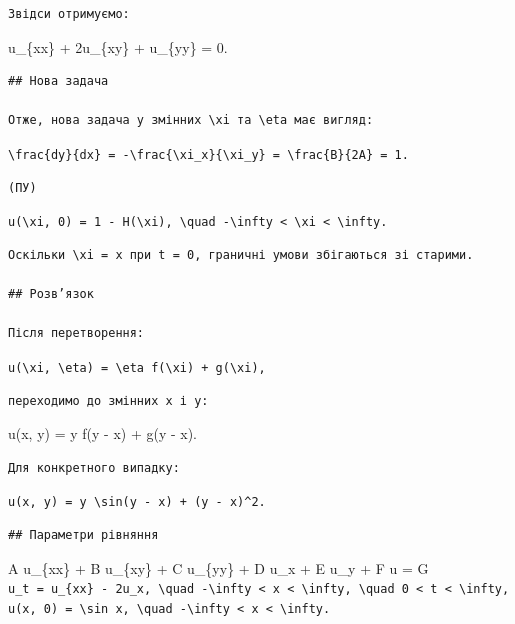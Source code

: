 \documentclass[
  ukrainian,
]{article}
\begin{document}
\begin{verbatim}
Звідси отримуємо:
\end{verbatim}

u\_\{xx\} + 2u\_\{xy\} + u\_\{yy\} = 0.

\begin{verbatim}
## Нова задача

Отже, нова задача у змінних \xi та \eta має вигляд:
\end{verbatim}

\texttt{\textbackslash{}frac\{dy\}\{dx\}\ =\ -\textbackslash{}frac\{\textbackslash{}xi\_x\}\{\textbackslash{}xi\_y\}\ =\ \textbackslash{}frac\{B\}\{2A\}\ =\ 1.}

\begin{verbatim}
(ПУ)
\end{verbatim}

\texttt{u(\textbackslash{}xi,\ 0)\ =\ 1\ -\ H(\textbackslash{}xi),\ \textbackslash{}quad\ -\textbackslash{}infty\ \textless{}\ \textbackslash{}xi\ \textless{}\ \textbackslash{}infty.}

\begin{verbatim}
Оскільки \xi = x при t = 0, граничні умови збігаються зі старими.

## Розв’язок

Після перетворення:
\end{verbatim}

\texttt{u(\textbackslash{}xi,\ \textbackslash{}eta)\ =\ \textbackslash{}eta\ f(\textbackslash{}xi)\ +\ g(\textbackslash{}xi),}

\begin{verbatim}
переходимо до змінних x і y:
\end{verbatim}

u(x, y) = y f(y - x) + g(y - x).

\begin{verbatim}
Для конкретного випадку:
\end{verbatim}

\texttt{u(x,\ y)\ =\ y\ \textbackslash{}sin(y\ -\ x)\ +\ (y\ -\ x)\^{}2.}

\begin{verbatim}
## Параметри рівняння
\end{verbatim}

A u\_\{xx\} + B u\_\{xy\} + C u\_\{yy\} + D u\_x + E u\_y + F u = G
\texttt{u\_t\ =\ u\_\{xx\}\ -\ 2u\_x,\ \textbackslash{}quad\ -\textbackslash{}infty\ \textless{}\ x\ \textless{}\ \textbackslash{}infty,\ \textbackslash{}quad\ 0\ \textless{}\ t\ \textless{}\ \textbackslash{}infty,}
\texttt{u(x,\ 0)\ =\ \textbackslash{}sin\ x,\ \textbackslash{}quad\ -\textbackslash{}infty\ \textless{}\ x\ \textless{}\ \textbackslash{}infty.}
\end{document}
